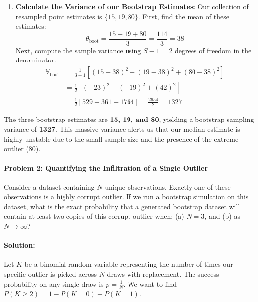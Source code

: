 \documentclass{article}
\begin{document}
\begin{enumerate}
    \item \textbf{Calculate the Variance of our Bootstrap Estimates:}
    Our collection of resampled point estimates is $\{15, 19, 80\}$. 
    First, find the mean of these estimates:
    \begin{equation}
    \bar{\theta}_{\text{boot}} = \frac{15 + 19 + 80}{3} = \frac{114}{3} = 38
    \end{equation}
    Next, compute the sample variance using $S-1 = 2$ degrees of freedom in the denominator:
    \begin{align}
    \mathbb{V}_{\text{boot}} &= \frac{1}{3-1} \left[ (15 - 38)^2 + (19 - 38)^2 + (80 - 38)^2 \right] \\
    &= \frac{1}{2} \left[ (-23)^2 + (-19)^2 + (42)^2 \right] \\
    &= \frac{1}{2} \left[ 529 + 361 + 1764 \right] = \frac{2654}{2} = 1327
    \end{align}
\end{enumerate}
The three bootstrap estimates are \textbf{15, 19, and 80}, yielding a bootstrap sampling variance of \textbf{1327}. This massive variance alerts us that our median estimate is highly unstable due to the small sample size and the presence of the extreme outlier ($80$).

\paragraph{Problem 2: Quantifying the Infiltration of a Single Outlier}
Consider a dataset containing $N$ unique observations. Exactly one of these observations is a highly corrupt outlier. If we run a bootstrap simulation on this dataset, what is the exact probability that a generated bootstrap dataset will contain at least two copies of this corrupt outlier when: (a) $N=3$, and (b) as $N \to \infty$?

\paragraph{Solution:}
Let $K$ be a binomial random variable representing the number of times our specific outlier is picked across $N$ draws with replacement. The success probability on any single draw is $p = \frac{1}{N}$. We want to find $P(K \ge 2) = 1 - P(K = 0) - P(K = 1)$.
\end{document}
